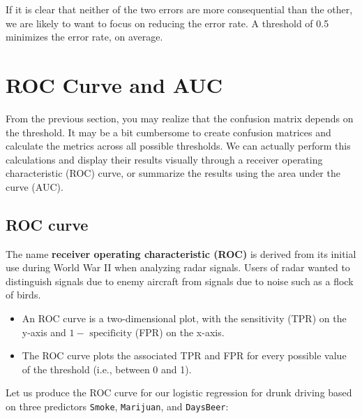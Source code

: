 \documentclass[
]{book}
\providecommand{\tightlist}{%
  \setlength{\itemsep}{0pt}\setlength{\parskip}{0pt}}
\begin{document}
If it is clear that neither of the two errors are more consequential than the other, we are likely to want to focus on reducing the error rate. A threshold of 0.5 minimizes the error rate, on average.

\hypertarget{roc-curve-and-auc}{%
\section{ROC Curve and AUC}\label{roc-curve-and-auc}}

From the previous section, you may realize that the confusion matrix depends on the threshold. It may be a bit cumbersome to create confusion matrices and calculate the metrics across all possible thresholds. We can actually perform this calculations and display their results visually through a receiver operating characteristic (ROC) curve, or summarize the results using the area under the curve (AUC).

\hypertarget{roc-curve}{%
\subsection{ROC curve}\label{roc-curve}}

The name \textbf{receiver operating characteristic (ROC)} is derived from its initial use during World War II when analyzing radar signals. Users of radar wanted to distinguish signals due to enemy aircraft from signals due to noise such as a flock of birds.

\begin{itemize}
\tightlist
\item
  An ROC curve is a two-dimensional plot, with the sensitivity (TPR) on the y-axis and \(1 - \text{ specificity}\) (FPR) on the x-axis.
\item
  The ROC curve plots the associated TPR and FPR for every possible value of the threshold (i.e., between 0 and 1).
\end{itemize}

Let us produce the ROC curve for our logistic regression for drunk driving based on three predictors \texttt{Smoke}, \texttt{Marijuan}, and \texttt{DaysBeer}:
\end{document}
